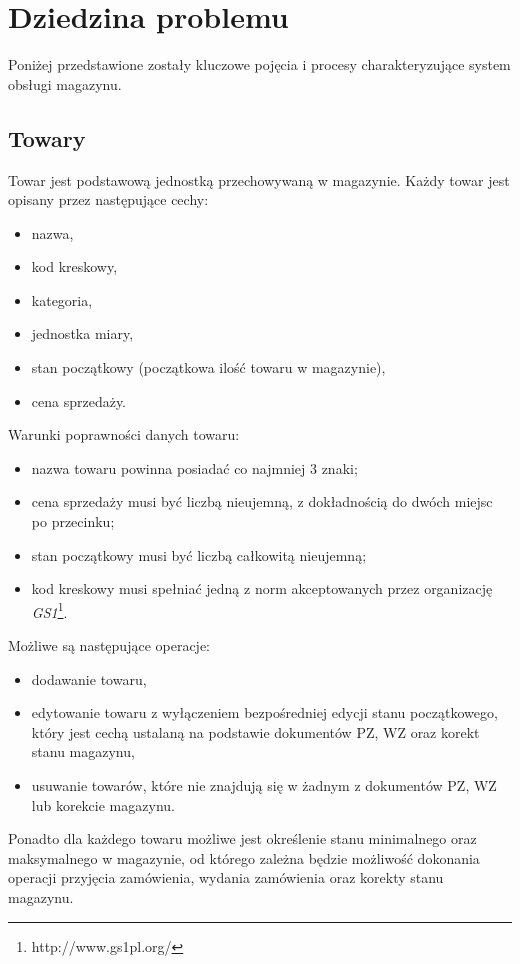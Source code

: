 \section{Dziedzina problemu}
\label{dziedzina-problemu}
Poniżej przedstawione zostały kluczowe pojęcia i procesy
charakteryzujące system obsługi magazynu.

\subsection{Towary}
Towar jest podstawową jednostką przechowywaną w magazynie. Każdy towar
jest opisany przez następujące cechy:
\begin{itemize}
\item nazwa,
\item kod kreskowy,
\item kategoria,
\item jednostka miary,
\item stan początkowy (początkowa ilość towaru w magazynie),
\item cena sprzedaży.
\end{itemize}

Warunki poprawności danych towaru:
\begin{itemize}
\item nazwa towaru powinna posiadać co najmniej 3 znaki;
\item cena sprzedaży musi być liczbą nieujemną, z dokładnością do
  dwóch miejsc po przecinku;
\item stan początkowy musi być liczbą całkowitą nieujemną;
\item kod kreskowy musi spełniać jedną z norm akceptowanych przez
  organizację \emph{GS1}\footnote{http://www.gs1pl.org/}.
\end{itemize}

Możliwe są następujące operacje:
\begin{itemize}
\item dodawanie towaru,
\item edytowanie towaru z wyłączeniem bezpośredniej edycji stanu
  początkowego, który jest cechą ustalaną na podstawie dokumentów PZ,
  WZ oraz korekt stanu magazynu,
\item usuwanie towarów, które nie znajdują się w żadnym z dokumentów
  PZ, WZ lub korekcie magazynu.
\end{itemize}

Ponadto dla każdego towaru możliwe jest określenie stanu minimalnego
oraz maksymalnego w magazynie, od którego zależna będzie możliwość
dokonania operacji przyjęcia zamówienia, wydania zamówienia oraz
korekty stanu magazynu.

